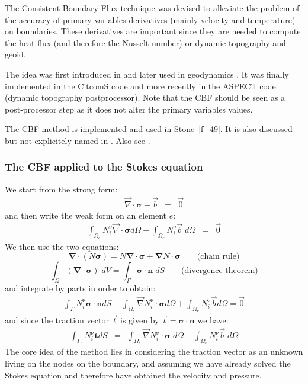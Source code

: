The Consistent Boundary Flux technique was devised to 
alleviate the problem of the accuracy of primary variables 
derivatives (mainly velocity and temperature) on boundaries.
These derivatives are important since they are needed to compute
the heat flux (and therefore the Nusselt number) or 
dynamic topography and geoid. 

The idea was first introduced in \cite{mizu86} and later used 
in geodynamics \cite{zhgh93}. It was finally implemented 
in the CitcomS code \cite{zhmt08} and more recently
in the ASPECT code (dynamic topography postprocessor).
Note that the CBF should be seen as a post-processor step 
as it does not alter the primary variables values.

The CBF method is implemented and used in Stone~\ref{f_49}.
It is also discussed but not explicitely named in \cite[p309]{reddybook2}.
Also see \cite{lahe76,grls87,mahz78}.

\subsubsection{The CBF applied to the Stokes equation}
We start from the strong form:
\begin{eqnarray}
{\vec \nabla}\cdot {\bm \sigma} + {\vec b} &=& {\vec 0} 
\end{eqnarray}
and then write the weak form on an element $e$:
\begin{eqnarray}
\int_{\Omega_e} N_i^\upnu {\vec \nabla}\cdot {\bm \sigma} d\Omega + \int_{\Omega_e} N_i^\upnu  {\vec b} \; d\Omega 
&=& \vec 0 
\end{eqnarray}
We then use the two equations:  
\[
\bm \nabla \cdot ( N  \bm \sigma ) = N \bm \nabla \cdot \bm \sigma + \bm \nabla N \cdot  \bm \sigma  
\qquad \text{(chain rule)}
\]
\[
\int_\Omega (\bm \nabla \cdot {\bm \sigma} )\; dV = \int_\Gamma {\bm \sigma} \cdot \bm n \; dS
\qquad \text{(divergence theorem)}
\]
and integrate by parts in order to obtain:
\begin{eqnarray}
\int_\Gamma N_i^\upnu {\bm \sigma}\cdot{\bm n} dS - 
\int_{\Omega_e} {\vec \nabla } N_i^\upnu \cdot {\bm \sigma} d\Omega + \int_{\Omega_e} N_i^\upnu  {\vec b} d\Omega =\vec{0}
\end{eqnarray}
and since the traction vector ${\vec t}$ is given by $\vec{t}={\bm \sigma}\cdot{\bm n}$ we have:
\begin{eqnarray}
\int_{\Gamma_e}  N_i^\upnu {\bm t} dS 
&=& \int_{\Omega_e} {\vec \nabla } N_i^\upnu \cdot {\bm \sigma}\; d\Omega 
- \int_{\Omega_e} N_i^\upnu  {\vec b} \; d\Omega   \label{eq:cbf1}
\end{eqnarray}
The core idea of the method lies in considering the traction vector as an unknown 
living on the nodes on the boundary, and assuming we have already solved the Stokes 
equation and therefore have obtained the velocity and pressure.

